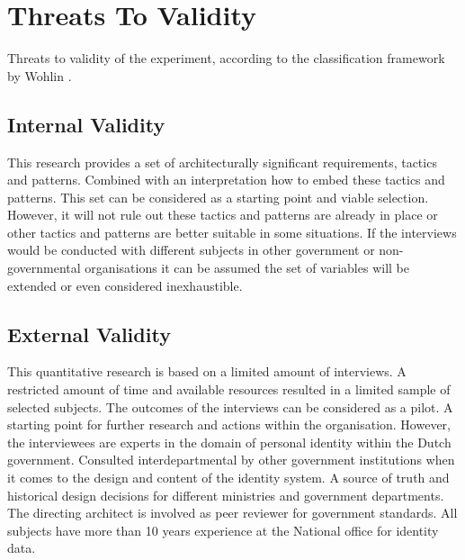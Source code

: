 \chapter{Threats To Validity}\label{sec:threats}
Threats to validity of the experiment, according to the classification framework by Wohlin \etal \cite{wohlin12}.

\section{Internal Validity}
This research provides a set of architecturally significant requirements, tactics and patterns. Combined with an interpretation how to embed these tactics and patterns.
This set can be considered as a starting point and viable selection. However, it will not rule out these tactics and patterns are already in place or other tactics and patterns are better suitable in some situations. If the interviews would be conducted with different subjects in other government or non-governmental organisations it can be assumed the set of variables will be extended or even considered inexhaustible.

\section{External Validity}
This quantitative research is based on a limited amount of interviews. A restricted amount of time and available resources resulted in a limited sample of selected subjects. The outcomes of the interviews can be considered as a pilot. A starting point for further research and actions within the organisation. 
However, the interviewees are experts in the domain of personal identity within the Dutch government. Consulted interdepartmental by other government institutions when it comes to the design and content of the identity system. A source of truth and historical design decisions for different ministries and government departments. The directing architect is involved as peer reviewer for government standards. All subjects have more than 10 years experience at the National office for identity data.  

